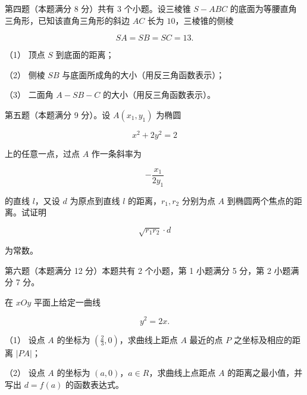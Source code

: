 \begin{question}

第四题（本题满分 8 分）共有 3 个小题。设三棱锥 $S-ABC$ 的底面为等腰直角三角形，已知该直角三角形的斜边 $AC$ 长为 $10$，三棱锥的侧棱

\nopagebreak[4]
\[
SA=SB=SC=13.
\]

（1） 顶点 $S$ 到底面的距离；

（2） 侧棱 $SB$ 与底面所成角的大小（用反三角函数表示）；

（3） 二面角 $A-SB-C$ 的大小（用反三角函数表示）。
\nopagebreak[4]
\begin{center}\end{center}
\nopagebreak[4]
\end{question}
\begin{question}

第五题（本题满分 9 分）。设 $A(x_1,y_1)$ 为椭圆

\nopagebreak[4]
\[
x^2+2y^2=2
\]

上的任意一点，过点 $A$ 作一条斜率为

\nopagebreak[4]
\[
-\frac{x_1}{2y_1}
\]

的直线 $l$，又设 $d$ 为原点到直线 $l$ 的距离，$r_1,r_2$ 分别为点 $A$ 到椭圆两个焦点的距离。试证明

\nopagebreak[4]
\[
\sqrt{r_1r_2}\cdot d
\]

为常数。

\end{question}
\begin{question}

第六题（本题满分 12 分）本题共有 2 个小题，第 1 小题满分 5 分，第 2 小题满分 7 分。

在 $xOy$ 平面上给定一曲线

\nopagebreak[4]
\[
y^2=2x.
\]

（1） 设点 $A$ 的坐标为 $\left(\frac23,0\right)$，求曲线上距点 $A$ 最近的点 $P$ 之坐标及相应的距离 $|PA|$；

（2） 设点 $A$ 的坐标为 $(a,0)$，$a\in R$，求曲线上点距点 $A$ 的距离之最小值，并写出 $d=f(a)$ 的函数表达式。

\end{question}
